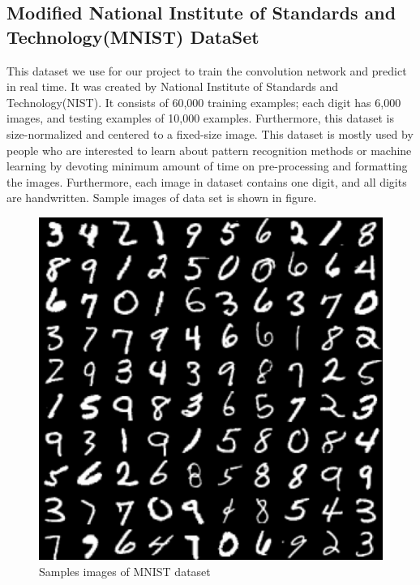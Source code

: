 \documentclass[12pt, letterpaper]{article}
\begin{document}
\subsection{Modified National Institute of Standards and Technology(MNIST) DataSet}

This dataset we use for our project to train the convolution network and predict in real time. It was created by National Institute of Standards and Technology(NIST). It consists of 60,000 training examples; each digit has 6,000 images, and testing examples of 10,000 examples. Furthermore, this dataset is size-normalized and centered to a fixed-size image. This dataset is mostly used by people who are interested to learn about pattern recognition methods or machine learning by devoting minimum amount of time on pre-processing and formatting the images. Furthermore, each image in dataset contains one digit, and all digits are handwritten. Sample images of data set is shown in figure.


\begin{figure}[!h]
	\begin{center}	
		\includegraphics[scale = 0.5]{mnist-digits-small.png}
		\caption{ \cite{Classifying MNIST Digits} Samples images of MNIST dataset }
		
	\end{center}
\end{figure}  
\end{document}
